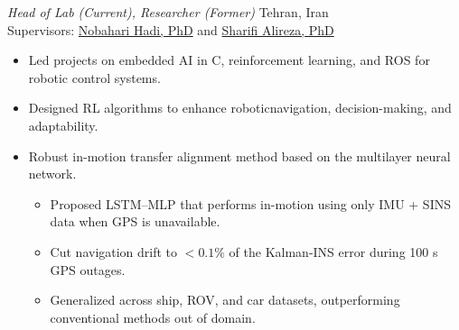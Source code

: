 \documentclass[12pt]{article}
\begin{document}
\noindent \textit{Head of Lab (Current), Researcher (Former)}
\hfill Tehran, Iran \\[2pt]
\noindent Supervisors:
\href{https://ae.sharif.edu/~portal/faculty/1091235256}{Nobahari Hadi, PhD} and
\href{https://ae.sharif.edu/~portal/faculty/1730782165}{Sharifi Alireza, PhD}
\vspace{-4pt}
\begin{itemize}  \itemsep 1pt %
    \item Led projects on {embedded AI} in C, {reinforcement learning}, and {ROS} for robotic control systems.
	\item Designed {RL} algorithms to enhance robotic{navigation}, {decision-making}, and adaptability.
    \item Robust in-motion transfer alignment method based on the multilayer neural network. \href{https://github.com/alibaniasad1999/INS-AI}{\faGithub}
\vspace{-6pt}
    \begin{itemize}
		\item Proposed {LSTM–MLP} that performs in-motion using only IMU + SINS data when GPS is unavailable.
    \item Cut navigation drift to \(\!<\!0.1\%\) of the Kalman-INS error during 100 s GPS outages.
    \item Generalized across ship, ROV, and car datasets, outperforming conventional methods out of domain.
    \end{itemize}
\end{itemize}
\end{document}
